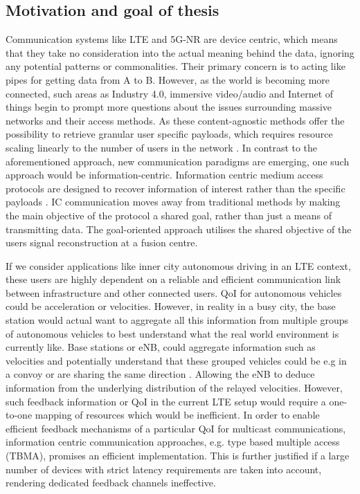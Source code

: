 \documentclass{article}
\begin{document}
\subsection{Motivation and goal of thesis}
Communication systems like \ac{LTE} and 5G-NR are device centric, which means that they take no consideration into the actual meaning behind the data, ignoring any potential patterns or commonalities. Their primary concern is to acting like pipes for getting data from A to B.
However, as the world is becoming more connected, such areas as Industry 4.0, immersive video/audio and Internet of things begin to prompt more questions about the issues surrounding massive networks and their access methods. As these content-agnostic methods offer the possibility to retrieve granular user specific payloads, which requires resource scaling linearly to the number of users in the network \cite{aloha,graphbased_analysis,coded_ran,capacity_gauss}. In contrast to the aforementioned approach, new communication paradigms are emerging, one such approach would be information-centric. Information centric  medium access protocols are designed to recover information of interest rather than the specific payloads \cite{kountouris,sem_coms,sem_filter,source_chane_coding,source_chane_coding2}. \ac{IC} communication moves away from traditional methods by making the main objective of the protocol a shared goal, rather than just a means of transmitting data. The goal-oriented approach utilises the shared objective of the users signal reconstruction at a fusion centre. 

If we consider applications like inner city autonomous driving in an LTE context, these users are highly dependent on a reliable and efficient communication link between infrastructure and other connected users. \ac{QoI} for autonomous vehicles could be acceleration or velocities. However, in reality in a busy city, the base station would actual want to aggregate all this information from multiple groups of autonomous vehicles to best understand what the real world environment is currently like. Base stations or \ac{eNB}, could aggregate information such as velocities and potentially understand that these grouped vehicles could be e.g in a convoy or are sharing the same direction . Allowing the \ac{eNB} to deduce information from the underlying distribution of the relayed velocities. However, such feedback information or \ac{QoI} in the current \ac{LTE} setup would require a one-to-one mapping of resources which would be inefficient. In order to enable efficient feedback mechanisms of a particular \ac{QoI} for multicast communications, information centric communication approaches, e.g. type based multiple access (TBMA)\cite{tbma}, promises an efficient implementation. This is further justified if a large number of devices with strict latency requirements are taken into account, rendering dedicated feedback channels ineffective. 
\end{document}
